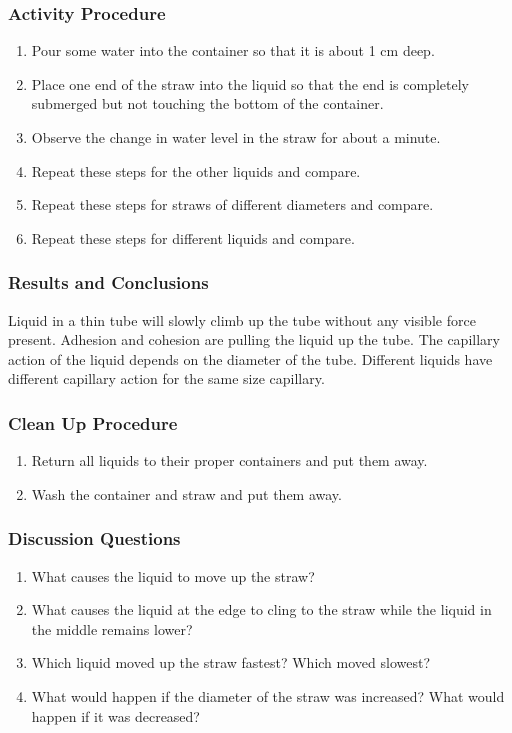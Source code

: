 \subsubsection*{Activity Procedure}
\begin{enumerate}
\item{Pour some water into the container so that it is about 1 cm deep.} 
\item{Place one end of the straw into the liquid so that the end is completely submerged but not touching the bottom of the container.} 
\item{Observe the change in water level in the straw for about a minute.} 
\item{Repeat these steps for the other liquids and compare.}
\item{Repeat these steps for straws of different diameters and compare.} 
\item{Repeat these steps for different liquids and compare.} 
\end{enumerate}

\subsubsection*{Results and Conclusions}
Liquid in a thin tube will slowly climb up the tube without any visible force present. Adhesion and cohesion are pulling the liquid up the tube. The capillary action of the liquid depends on the diameter of the tube. Different liquids have different capillary action for the same size capillary.

\subsubsection*{Clean Up Procedure}
\begin{enumerate}
\item{Return all liquids to their proper containers and put them away.} 
\item{Wash the container and straw and put them away.} 
\end{enumerate}

\subsubsection*{Discussion Questions}
\begin{enumerate}
\item{What causes the liquid to move up the straw?}
\item{What causes the liquid at the edge to cling to the straw while the liquid in the middle remains lower?}
\item{Which liquid moved up the straw fastest? Which moved slowest?}
\item{What would happen if the diameter of the straw was increased? What would happen if it was decreased?}
\end{enumerate}

